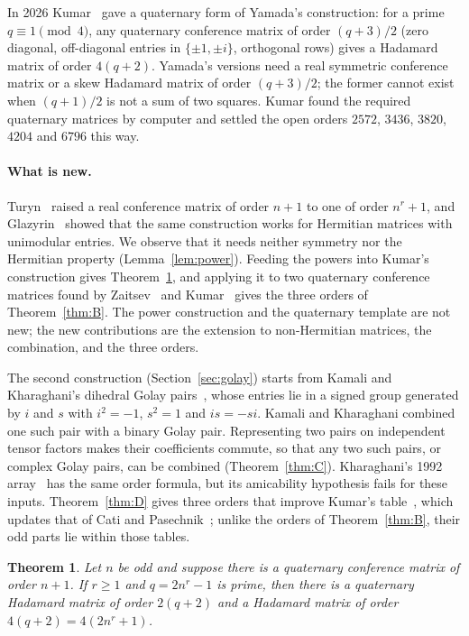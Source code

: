 \documentclass[10pt]{article}
\newtheorem{theorem}{Theorem}
\theoremstyle{remark}
\begin{document}
In 2026 Kumar~\cite{Ku26} gave a quaternary form of Yamada's construction: for a prime $q\equiv1\pmod 4$, any quaternary conference matrix of order $(q+3)/2$ (zero diagonal, off-diagonal entries in $\{\pm1,\pm i\}$, orthogonal rows) gives a Hadamard matrix of order $4(q+2)$. Yamada's versions need a real symmetric conference matrix or a skew Hadamard matrix of order $(q+3)/2$; the former cannot exist when $(q+1)/2$ is not a sum of two squares. Kumar found the required quaternary matrices by computer and settled the open orders $2572$, $3436$, $3820$, $4204$ and $6796$ this way.

\paragraph{What is new.} Turyn~\cite{Tu71} raised a real conference matrix of order $n+1$ to one of order $n^r+1$, and Glazyrin~\cite{Gl26} showed that the same construction works for Hermitian matrices with unimodular entries. We observe that it needs neither symmetry nor the Hermitian property (Lemma~\ref{lem:power}). Feeding the powers into Kumar's construction gives Theorem~\ref{thm:A}, and applying it to two quaternary conference matrices found by Zaitsev~\cite{Za26} and Kumar~\cite{Ku26} gives the three orders of Theorem~\ref{thm:B}. The power construction and the quaternary template are not new; the new contributions are the extension to non-Hermitian matrices, the combination, and the three orders.

The second construction (Section~\ref{sec:golay}) starts from Kamali and Kharaghani's dihedral Golay pairs~\cite{KK98}, whose entries lie in a signed group generated by $i$ and $s$ with $i^2=-1$, $s^2=1$ and $is=-si$. Kamali and Kharaghani combined one such pair with a binary Golay pair. Representing two pairs on independent tensor factors makes their coefficients commute, so that any two such pairs, or complex Golay pairs, can be combined (Theorem~\ref{thm:C}). Kharaghani's 1992 array~\cite{Kh92} has the same order formula, but its amicability hypothesis fails for these inputs. Theorem~\ref{thm:D} gives three orders that improve Kumar's table~\cite{Ku26}, which updates that of Cati and Pasechnik~\cite{CP24}; unlike the orders of Theorem~\ref{thm:B}, their odd parts lie within those tables.

\begin{theorem}\label{thm:A}
Let $n$ be odd and suppose there is a quaternary conference matrix of order $n+1$. If $r\ge1$ and $q=2n^r-1$ is prime, then there is a quaternary Hadamard matrix of order $2(q+2)$ and a Hadamard matrix of order $4(q+2)=4(2n^r+1)$.
\end{theorem}
\end{document}
